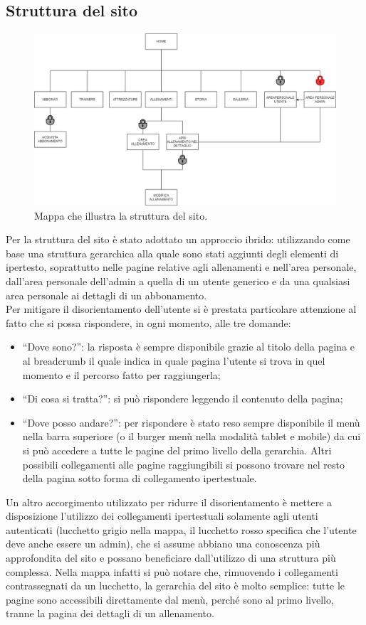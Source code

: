 \documentclass[a4paper]{article}
\begin{document}
	\subsection{Struttura del sito}
	\begin{figure}[H]
		\centering
		\includegraphics[scale=0.3]{immagini/mappa_sito.drawio.png}
		\caption{Mappa che illustra la struttura del sito.}
	\end{figure}
	
	Per la struttura del sito è stato adottato un approccio ibrido: utilizzando come base una struttura gerarchica alla quale sono stati aggiunti degli elementi di ipertesto, soprattutto nelle pagine relative agli allenamenti e nell'area personale, dall'area personale dell'admin a quella di un utente generico e da una qualsiasi area personale ai dettagli di un abbonamento.\\
	Per mitigare il disorientamento dell'utente si è prestata particolare attenzione al fatto che si possa rispondere, in ogni momento, alle tre domande:
	\begin{itemize}
		\item “Dove sono?”: la risposta è sempre disponibile grazie al titolo della pagina e al breadcrumb il quale indica in quale pagina l'utente si trova in quel momento e il percorso fatto per raggiungerla;
		\item “Di cosa si tratta?”: si può rispondere leggendo il contenuto della pagina;
		\item “Dove posso andare?”: per rispondere è stato reso sempre disponibile il menù nella barra superiore (o il burger menù nella modalità tablet e mobile) da cui si può accedere a tutte le pagine del primo livello della gerarchia. Altri possibili collegamenti alle pagine raggiungibili si possono trovare nel resto della pagina sotto forma di collegamento ipertestuale.
	\end{itemize}
	Un altro accorgimento utilizzato per ridurre il disorientamento è mettere a disposizione l'utilizzo dei collegamenti ipertestuali solamente agli utenti autenticati (lucchetto grigio nella mappa, il lucchetto rosso specifica che l'utente deve anche essere un admin), che si assume abbiano una conoscenza più approfondita del sito e possano beneficiare dall'utilizzo di una struttura più complessa. Nella mappa infatti si può notare che, rimuovendo i collegamenti contrassegnati da un lucchetto, la gerarchia del sito è molto semplice: tutte le pagine sono accessibili direttamente dal menù, perché sono al primo livello, tranne la pagina dei dettagli di un allenamento.
\end{document}
